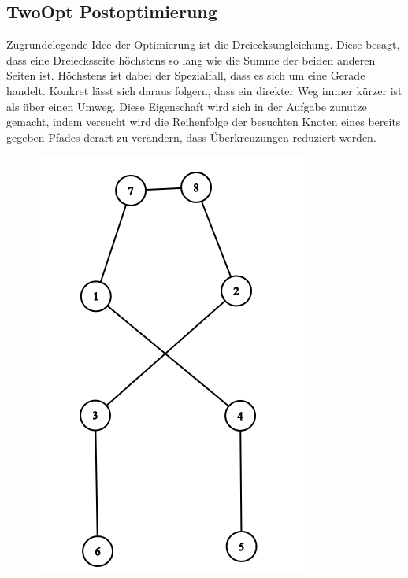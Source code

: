 \subsection{TwoOpt Postoptimierung}\label{subsec:twoopt-postoptimierung}
Zugrundelegende Idee der Optimierung ist die Dreiecksungleichung.
Diese besagt, dass eine Dreiecksseite höchstens so lang wie die Summe der beiden anderen Seiten ist.
Höchstens ist dabei der Spezialfall, dass es sich um eine Gerade handelt.
Konkret lässt sich daraus folgern, dass ein direkter Weg immer kürzer ist als über einen Umweg.
Diese Eigenschaft wird sich in der Aufgabe zunutze gemacht, indem versucht wird die Reihenfolge der besuchten Knoten eines
bereits gegeben Pfades derart zu verändern, dass Überkreuzungen reduziert werden.
\begin{figure}[h]
    \centering
    \begin{minipage}[b]{0.3\textwidth}
        \includegraphics[width=\textwidth]{2opt1}

\end{minipage}
\end{figure}
